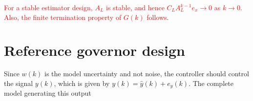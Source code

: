 \documentclass[a4paper]{article}
\begin{document}
\textcolor{red}{For a stable estimator design, $A_L$ is stable, and hence $C_LA_L^{k-1}e_x \rightarrow 0$ as $k \rightarrow 0$. Also, the finite termination property of $G(k)$ follows}.

\section{Reference governor design}
Since $w(k)$ is the model uncertainty and not noise, the controller should control the signal $y(k)$, which is given by $
y(k) = \hat{y}(k)+e_y(k)$.
The complete model generating this output



\end{document}
